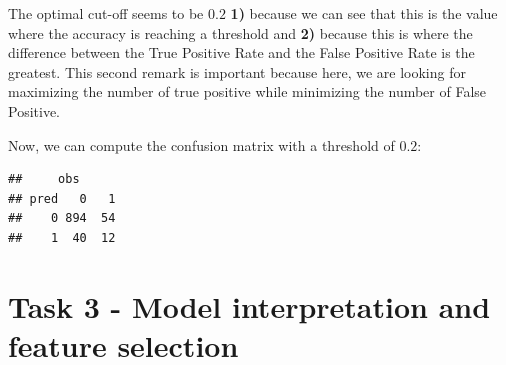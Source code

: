 \documentclass[
  12pt,
  oneside]{report}
\begin{document}
The optimal cut-off seems to be \(0.2\) \textbf{1)} because we can see that this is the value where the accuracy is reaching a threshold and \textbf{2)} because this is where the difference between the True Positive Rate and the False Positive Rate is the greatest. This second remark is important because here, we are looking for maximizing the number of true positive while minimizing the number of False Positive.

Now, we can compute the confusion matrix with a threshold of \(0.2\):

\begin{verbatim}
##     obs
## pred   0   1
##    0 894  54
##    1  40  12
\end{verbatim}

\hypertarget{task-3---model-interpretation-and-feature-selection}{%
\chapter{Task 3 - Model interpretation and feature selection}\label{task-3---model-interpretation-and-feature-selection}}
\end{document}
